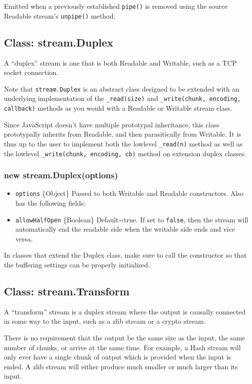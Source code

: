Emitted when a previously established \texttt{pipe()} is removed using
the source Readable stream's \texttt{unpipe()} method.

\subsection{Class: stream.Duplex}

A ``duplex'' stream is one that is both Readable and Writable, such as a
TCP socket connection.

Note that \texttt{stream.Duplex} is an abstract class designed to be
extended with an underlying implementation of the \texttt{\_read(size)}
and \texttt{\_write(chunk, encoding, callback)} methods as you would
with a Readable or Writable stream class.

Since JavaScript doesn't have multiple prototypal inheritance, this
class prototypally inherits from Readable, and then parasitically from
Writable. It is thus up to the user to implement both the lowlevel
\texttt{\_read(n)} method as well as the lowlevel
\texttt{\_write(chunk, encoding, cb)} method on extension duplex
classes.

\subsubsection{new stream.Duplex(options)}

\begin{itemize}
\item
  \texttt{options} \{Object\} Passed to both Writable and Readable
  constructors. Also has the following fields:
\item
  \texttt{allowHalfOpen} \{Boolean\} Default=true. If set to
  \texttt{false}, then the stream will automatically end the readable
  side when the writable side ends and vice versa.
\end{itemize}

In classes that extend the Duplex class, make sure to call the
constructor so that the buffering settings can be properly initialized.

\subsection{Class: stream.Transform}

A ``transform'' stream is a duplex stream where the output is causally
connected in some way to the input, such as a zlib stream or a crypto
stream.

There is no requirement that the output be the same size as the input,
the same number of chunks, or arrive at the same time. For example, a
Hash stream will only ever have a single chunk of output which is
provided when the input is ended. A zlib stream will either produce much
smaller or much larger than its input.


